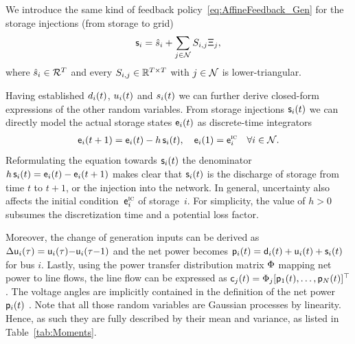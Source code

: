 \documentclass[final,3p,times,twocolumn]{elsarticle}  %
\begin{document}
We introduce the same kind of feedback policy~\eqref{eq:AffineFeedback_Gen} for the storage injections (from storage to grid)
\begin{align}
\label{eq:StoragePolicyPerBusPerTime}
\rv\storage_i
= \hat{\storage}_i + \sum_{j \in \mathcal{\nbus}} \Storage_{i,j} \rv\Xi_j,
\end{align}
where $\hat{s}_i\in\mathcal{R}^{T}$ and every $\Storage_{i,j} \in \mathbb{R}^{\horizon \times \horizon}$ with $j \in \mathcal{N}$ is lower-triangular.

Having established $d_i(t)$, $u_i(t)$ and $s_i(t)$ we can further derive closed-form expressions of the other random variables.
From storage injections $\mathsf{s}_i(t)$ we can directly model the actual storage states $\mathsf{e}_i(t)$ as discrete-time integrators
\begin{align}
\label{eq:StorageDynamics_RV}
\mathsf{e}_i(t+1) = \mathsf{e}_i(t) - h \, \mathsf{s}_i(t), \quad \mathsf{e}_i(1) = \mathsf{e}_i^{\textsc{ic}} \quad \forall i \in \mathcal{N}.
\end{align}
Reformulating the equation towards $\mathsf{s}_i(t)$ the denominator $h \, \mathsf{s}_i(t) = \mathsf{e}_i(t)-\mathsf{e}_i(t+1)$ makes clear that $\mathsf{s}_i(t)$ is the discharge of storage from time $t$ to $t+1$, or the injection into the network.
In general, uncertainty also affects the initial condition~$\mathsf{e}_i^{\textsc{ic}}$ of storage~$i$.
For simplicity, the value of $h > 0$ subsumes the discretization time and a potential loss factor. 

Moreover, the change of generation inputs can be derived as $\Delta\mathsf{u}_i(\tau) = \mathsf{u}_i(\tau) {-} \mathsf{u}_i(\tau {-} 1)$ and the net power becomes $\mathsf{p}_i(t) = \mathsf{d}_i(t) + \mathsf{u}_i(t) + \mathsf{s}_i(t)$ for bus $i$. 
Lastly, using the power transfer distribution matrix $\Phi$ mapping net power to line flows, the line flow can be expressed as $\mathsf{c}_j(t) = \Phi_{j} [\mathsf{p}_1(t), \dots, \mathsf{p}_{N}(t)]^\top$. 
The voltage angles are implicitly contained in the definition of the net power $\mathsf{p}_i(t)$ \cite{horsch_linear_2017}.
Note that all those random variables are Gaussian processes by linearity. Hence, as such they are fully described by their mean and variance, as listed in Table~\ref{tab:Moments}.
\end{document}

